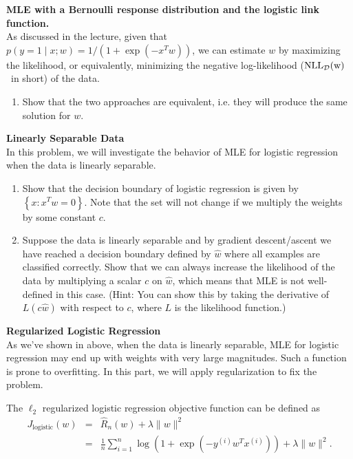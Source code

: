 \documentclass{article}
\newcommand{\nyuparagraph}[1]{\vspace{0.3cm}\textcolor{nyupurple}{\bf \large #1}\\}
\newcommand{\nll}{\rm NLL}
\theoremstyle{plain}
\theoremstyle{definition}
\begin{document}
\textbf{MLE with a Bernoulli response distribution and the logistic link function.}\\
As discussed in the lecture, given that
$p(y=1 \mid x; w) = 1 / (1 + \exp(-x^Tw))$,
we can estimate $w$ by maximizing the likelihood, or equivalently,
minimizing the negative log-likelihood ($\nll_{\cd}(w)$~in short) of the data.

\begin{enumerate}
  \setcounter{enumi}{\value{saveenum}}
  \item Show that the two approaches are equivalent, i.e. they will produce the same solution for $w$.
\setcounter{saveenum}{\value{enumi}}
\end{enumerate}
\nyuparagraph{Linearly Separable Data}
\label{sec:linear}
In this problem, we will investigate the behavior of MLE for logistic regression when the data is linearly separable.

\begin{enumerate}
  \setcounter{enumi}{\value{saveenum}}
\item Show that the decision boundary of logistic regression is given by $\left\{x\colon x^Tw=0\right\}$.
Note that the set will not change if we multiply the weights by some constant $c$.
\item Suppose the data is linearly separable and by gradient descent/ascent we have reached a decision boundary defined by $\hat{w}$ where all examples are classified correctly. 
Show that we can always increase the likelihood of the data by multiplying a scalar $c$ on $\hat{w}$,
which means that MLE is not well-defined in this case.
{(Hint: You can show this by taking the derivative of $L(c\hat{w})$ with respect to $c$, where $L$ is the likelihood function.)}

\setcounter{saveenum}{\value{enumi}}
\end{enumerate}

\nyuparagraph{\label{subsec:Regularized-Logistic-Regression}Regularized Logistic
Regression}
As we've shown in above, when the data is linearly separable,
MLE for logistic regression may end up with weights with very large magnitudes. Such a function is prone to overfitting.
In this part, we will apply regularization to fix the problem.

The $\ell_2$ regularized
logistic regression objective function can be defined as
\begin{eqnarray*}
J_{\text{logistic}}(w) & = & \hat{R}_{n}(w)+\lambda\|w\|^{2}\\
 & = & \frac{1}{n}\sum_{i=1}^{n}\log\left(1+\exp\left(-y^{(i)}w^{T}x^{(i)}\right)\right)+\lambda\|w\|^{2}.
\end{eqnarray*}
 
\end{document}
